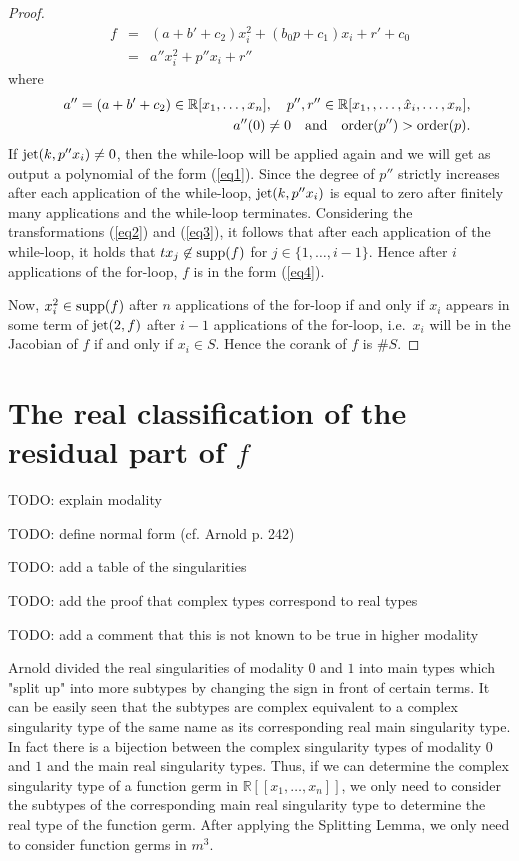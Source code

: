\documentclass{amsproc}
\begin{document}
\begin{proof}
\begin{eqnarray}
f&=&(a+b'+c_2)x_i^2+(b_0p+c_1)x_i+r'+c_0\nonumber\\
&=&a''x_i^2+p''x_i+r''\label{eq1}
\end{eqnarray}
where
\begin{eqnarray*}
&&a'' = (a+b'+c_2)\in\mathbb R[x_1,\ldots,x_n],\quad p'',r''\in\mathbb R[x_1,,\ldots,\hat x_i,\ldots,x_n],\\ &&a''(0)\neq0\quad\textnormal{and}\quad\textnormal{order}(p'')>\textnormal{order}(p).
\end{eqnarray*}
If $\textnormal{jet}(k,p''x_i)\neq 0$, then the while-loop will be applied again
and we will get as output a polynomial of the form (\ref{eq1}). Since the degree
of $p''$ strictly increases after each application of the while-loop,
$\textnormal{jet}(k,p''x_i)$ is equal to zero after finitely many applications
and the while-loop terminates. Considering the transformations  (\ref{eq2}) and
(\ref{eq3}), it follows that after each application of the while-loop, it holds
that $tx_j\not\in\textnormal{supp}(f)$ for $j\in\{1,\ldots,i-1\}$. Hence after $i$ applications of the for-loop, $f$ is in the form (\ref{eq4}).

Now, $x_i^2\in\textnormal{supp}(f)$ after $n$ applications of the for-loop if and only if $x_i$ appears in some term of $\textnormal{jet}(2,f)$ after $i-1$ applications of the for-loop, i.e.~$x_i$ will be in the Jacobian of $f$ if and only if $x_i\in S$. Hence the corank of $f$ is $\#S$.
\end{proof}

\section{The real classification of the residual part of $f$}
TODO: explain modality

TODO: define normal form (cf. Arnold p. 242)

TODO: add a table of the singularities

TODO: add the proof that complex types correspond to real types

TODO: add a comment that this is not known to be true in higher modality

Arnold divided the real singularities of modality $0$ and $1$ into main types
which "split up" into more subtypes by changing the sign in front of certain
terms. It can be easily seen that the subtypes are complex equivalent to a
complex singularity type of the same name as its corresponding real main
singularity type. In fact there is a bijection between the complex singularity
types of modality $0$ and $1$ and the main real singularity types. Thus, if we
can determine the complex singularity type of a function germ in $\mathbb
R[[x_1,\ldots,x_n]]$, we only need to consider the subtypes of the corresponding
main real singularity type to determine the real type of the function germ.
After applying the Splitting Lemma, we only need to consider function germs in $m^3$. 
\end{document}
